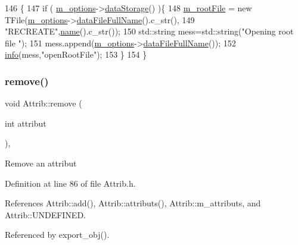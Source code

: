 \begin{DoxyCode}
146                                \{
147   \textcolor{keywordflow}{if} ( \hyperlink{classProcessus_a74205f3c1e00c4448f7b3257c2351797}{m\_options}->\hyperlink{classOptions_aed7799d10139fa542055b982cb820192}{dataStorage}() )\{
148     \hyperlink{classProcessus_a76114f8cf2111e910c323a7ae05a015d}{m\_rootFile} = \textcolor{keyword}{new} TFile(\hyperlink{classProcessus_a74205f3c1e00c4448f7b3257c2351797}{m\_options}->\hyperlink{classOptions_ab1cd9f237e9c18fd72323c74565453f8}{dataFileFullName}().c\_str(),
149                            \textcolor{stringliteral}{"RECREATE"},\hyperlink{classObject_a300f4c05dd468c7bb8b3c968868443c1}{name}().c\_str());
150         std::string mess=std::string(\textcolor{stringliteral}{"Opening root file "});
151         mess.append(\hyperlink{classProcessus_a74205f3c1e00c4448f7b3257c2351797}{m\_options}->\hyperlink{classOptions_ab1cd9f237e9c18fd72323c74565453f8}{dataFileFullName}());
152         \hyperlink{classObject_a644fd329ea4cb85f54fa6846484b84a8}{info}(mess,\textcolor{stringliteral}{"openRootFile"});
153   \}
154 \}
\end{DoxyCode}
\mbox{\label{classAttrib_a7d4ef7e32d93cb287792b87b857e79f3}} 
\subsubsection{\texorpdfstring{remove()}{remove()}}
{\footnotesize\ttfamily void Attrib\+::remove (\begin{DoxyParamCaption}\item[{int}]{attribut }\end{DoxyParamCaption})\hspace{0.3cm}{\ttfamily [inline]}, {\ttfamily [inherited]}}

Remove an attribut 

Definition at line 86 of file Attrib.\+h.



References Attrib\+::add(), Attrib\+::attributs(), Attrib\+::m\+\_\+attributs, and Attrib\+::\+U\+N\+D\+E\+F\+I\+N\+ED.



Referenced by export\+\_\+obj().


